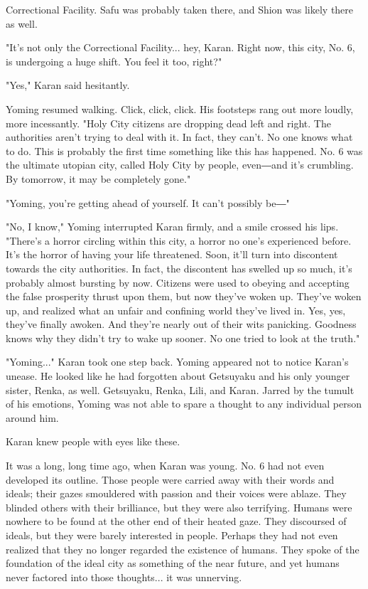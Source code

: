 Correctional Facility. Safu was probably taken there, and Shion was
likely there as well.

"It's not only the Correctional Facility... hey, Karan. Right now, this
city, No. 6, is undergoing a huge shift. You feel it too, right?"

"Yes," Karan said hesitantly.

Yoming resumed walking. Click, click, click. His footsteps rang out more
loudly, more incessantly. "Holy City citizens are dropping dead left and
right. The authorities aren't trying to deal with it. In fact, they
can't. No one knows what to do. This is probably the first time
something like this has happened. No. 6 was the ultimate utopian city,
called Holy City by people, even―and it's crumbling. By tomorrow, it may
be completely gone."

"Yoming, you're getting ahead of yourself. It can't possibly be―"

"No, I know," Yoming interrupted Karan firmly, and a smile crossed his
lips. "There's a horror circling within this city, a horror no one's
experienced before. It's the horror of having your life threatened.
Soon, it'll turn into discontent towards the city authorities. In fact,
the discontent has swelled up so much, it's probably almost bursting by
now. Citizens were used to obeying and accepting the false prosperity
thrust upon them, but now they've woken up. They've woken up, and
realized what an unfair and confining world they've lived in. Yes, yes,
they've finally awoken. And they're nearly out of their wits panicking.
Goodness knows why they didn't try to wake up sooner. No one tried to
look at the truth."

"Yoming..." Karan took one step back. Yoming appeared not to notice
Karan's unease. He looked like he had forgotten about Getsuyaku and his
only younger sister, Renka, as well. Getsuyaku, Renka, Lili, and Karan.
Jarred by the tumult of his emotions, Yoming was not able to spare a
thought to any individual person around him.

Karan knew people with eyes like these.

It was a long, long time ago, when Karan was young. No. 6 had not even
developed its outline. Those people were carried away with their words
and ideals; their gazes smouldered with passion and their voices were
ablaze. They blinded others with their brilliance, but they were also
terrifying. Humans were nowhere to be found at the other end of their
heated gaze. They discoursed of ideals, but they were barely interested
in people. Perhaps they had not even realized that they no longer
regarded the existence of humans. They spoke of the foundation of the
ideal city as something of the near future, and yet humans never
factored into those thoughts... it was unnerving.

